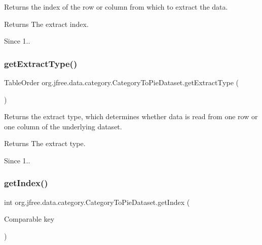 Returns the index of the row or column from which to extract the data.

\begin{DoxyReturn}{Returns}
The extract index.
\end{DoxyReturn}
\begin{DoxySince}{Since}
1.. 
\end{DoxySince}
\mbox{\label{classorg_1_1jfree_1_1data_1_1category_1_1_category_to_pie_dataset_a28a869dfdc0e7d844810da4a305063c7}} 
\subsubsection{\texorpdfstring{get\+Extract\+Type()}{getExtractType()}}
{\footnotesize\ttfamily Table\+Order org.\+jfree.\+data.\+category.\+Category\+To\+Pie\+Dataset.\+get\+Extract\+Type (\begin{DoxyParamCaption}{ }\end{DoxyParamCaption})}

Returns the extract type, which determines whether data is read from one row or one column of the underlying dataset.

\begin{DoxyReturn}{Returns}
The extract type.
\end{DoxyReturn}
\begin{DoxySince}{Since}
1.. 
\end{DoxySince}
\mbox{\label{classorg_1_1jfree_1_1data_1_1category_1_1_category_to_pie_dataset_a7a409f1cbb1cc8430652216156e3b7af}} 
\subsubsection{\texorpdfstring{get\+Index()}{getIndex()}}
{\footnotesize\ttfamily int org.\+jfree.\+data.\+category.\+Category\+To\+Pie\+Dataset.\+get\+Index (\begin{DoxyParamCaption}\item[{Comparable}]{key }\end{DoxyParamCaption})}

